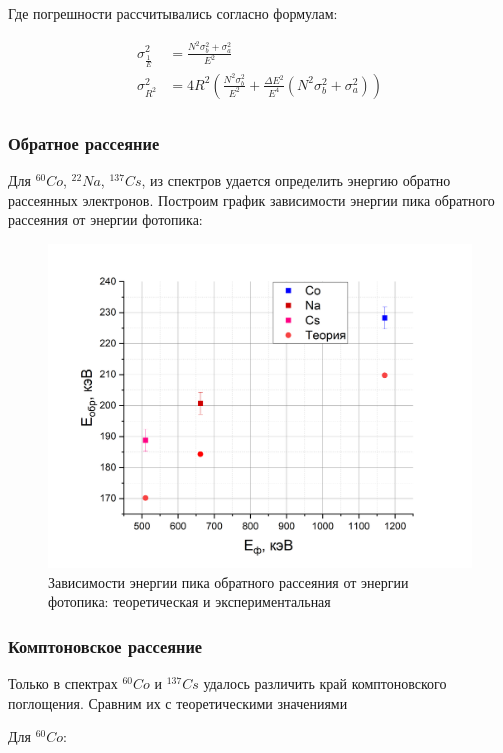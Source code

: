 \documentclass[a4paper,12pt]{article}
\begin{document}
Где погрешности рассчитывались согласно формулам:

\begin{align*}
	\sigma^2_{\frac{1}{E}} &= \frac{N^2 \sigma^2_b + \sigma^2_a}{E^2} \\
	\sigma^2_{R^2} &= 4R^2 \left( \frac{N^2 \sigma^2_b}{E^2} + \frac{\Delta E^2}{E^4} (N^2 \sigma^2_b + \sigma^2_a) \right) \\
\end{align*}

\newpage

\subsubsection*{Обратное рассеяние}

Для $^{60}Co$, $^{22}Na$, $^{137}Cs$, из спектров удается определить энергию обратно рассеянных электронов. Построим график зависимости энергии пика обратного рассеяния от энергии фотопика:

\begin{figure}[h!]
	\centering
	\includegraphics[width=0.8\linewidth]{graph9}
	\caption{Зависимости энергии пика обратного рассеяния от энергии фотопика: теоретическая и экспериментальная}
	\label{graph9:Back}
\end{figure}

\subsubsection*{Комптоновское рассеяние}

Только в спектрах $^{60}Co$ и $^{137}Cs$ удалось различить край комптоновского поглощения. Сравним их с теоретическими значениями

Для $^{60}Co$:
\end{document}
